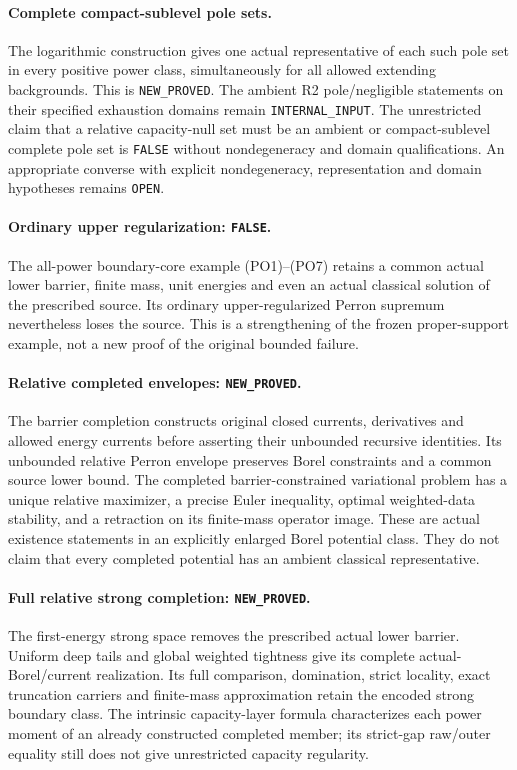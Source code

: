 \paragraph{Complete compact-sublevel pole sets.}
The logarithmic construction gives one actual
representative of each such pole set in every
positive power class, simultaneously for all
allowed extending backgrounds.
This is \texttt{NEW\_PROVED}.
The ambient R2 pole/negligible statements on
their specified exhaustion domains remain
\texttt{INTERNAL\_INPUT}.
The unrestricted claim that a relative
capacity-null set must be an ambient or
compact-sublevel complete pole set is
\texttt{FALSE} without nondegeneracy and
domain qualifications.
An appropriate converse with explicit
nondegeneracy, representation and domain
hypotheses remains \texttt{OPEN}.

\paragraph{Ordinary upper regularization: \texttt{FALSE}.}
The all-power boundary-core example (PO1)--(PO7)
retains a common actual lower barrier, finite
mass, unit energies and even an actual
classical solution of the prescribed source.
Its ordinary upper-regularized Perron
supremum nevertheless loses the source.
This is a strengthening of the frozen
proper-support example, not a new proof
of the original bounded failure.

\paragraph{Relative completed envelopes: \texttt{NEW\_PROVED}.}
The barrier completion constructs original
closed currents, derivatives and allowed
energy currents before asserting their
unbounded recursive identities.
Its unbounded relative Perron envelope
preserves Borel constraints and a common
source lower bound.
The completed barrier-constrained
variational problem has a unique relative
maximizer, a precise Euler inequality,
optimal weighted-data stability, and a
retraction on its finite-mass operator image.
These are actual existence statements in
an explicitly enlarged Borel potential
class.  They do not claim that every
completed potential has an ambient
classical representative.

\paragraph{Full relative strong completion: \texttt{NEW\_PROVED}.}
The first-energy strong space removes the prescribed actual
lower barrier. Uniform deep tails and global weighted tightness
give its complete actual-Borel/current realization. Its full
comparison, domination, strict locality, exact truncation
carriers and finite-mass approximation retain the encoded
strong boundary class. The intrinsic capacity-layer formula
characterizes each power moment of an already constructed
completed member; its strict-gap raw/outer equality still
does not give unrestricted capacity regularity.

